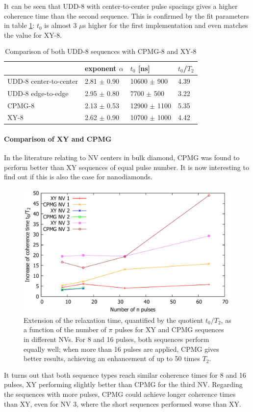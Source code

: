 \documentclass[12pt,a4paper]{article}
\begin{document}
It can be seen that UDD-8 with center-to-center pulse spacings gives a higher coherence time than the second sequence. This is confirmed by the fit parameters in table \ref{U8t}: $t_0$ is almost 3 $\mu$s higher for the first implementation and even matches the value for XY-8.\\
\begin{table}[H]
\centering
\caption{Comparison of both UDD-8 sequences with CPMG-8 and XY-8}
\label{U8t}
\begin{tabular}{l|ll|l}
& exponent $\alpha$ & $t_0$   {[}ns{]}                                                   & $t_0$/$T_2$              \\\hline
UDD-8 center-to-center       & 2.81           $\pm$ 0.90 & 10600          $\pm$ 900        & 4.39 \\
UDD-8 edge-to-edge       & 2.95          $\pm$ 0.80  & 7700          $\pm$ 500        & 3.22\\
CPMG-8          & 2.13          $\pm$ 0.53 & 12900            $\pm$ 1100         & 5.35 \\
XY-8            & 2.62          $\pm$ 0.90 & 10700          $\pm$ 1000          & 4.42       
\end{tabular}
\end{table}

\paragraph{Comparison of XY and CPMG}
In the literature relating to NV centers in bulk diamond, CPMG was found to perform better than XY sequences of equal pulse number\cite{dd}. It is now interesting to find out if this is also the case for nanodiamonds.
\begin{figure}[H] 
\includegraphics[scale=0.6]{xcvergleich.pdf} 
\caption{Extension of the relaxation time, quantified by the quotient $t_0/T_2$, as a function of the number of $\pi$ pulses for XY and CPMG sequences in different NVs. For 8 and 16 pulses, both sequences perform equally well; when more than 16 pulses are applied, CPMG gives better results, achieving an enhancement of up to 50 times $T_2$.}
\label{xc}
\end{figure}
It turns out that both sequence types reach similar coherence times for 8 and 16 pulses, XY performing slightly better than CPMG for the third NV. Regarding the sequences with more pulses, CPMG could achieve longer coherence times than XY, even for NV 3, where the short sequences performed worse than XY.
\end{document}
